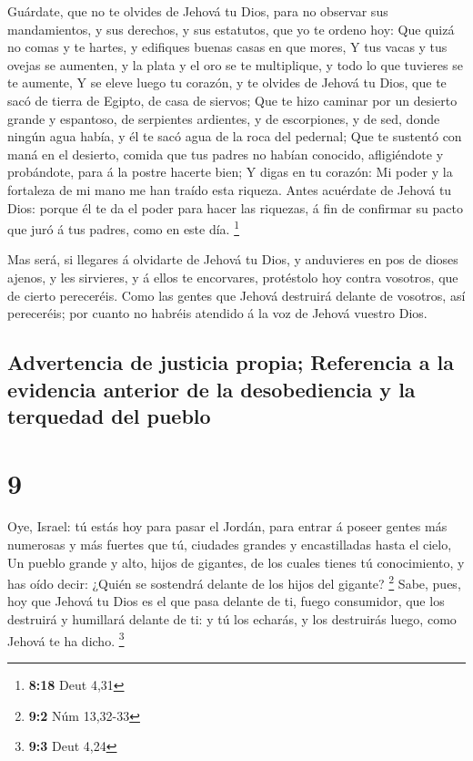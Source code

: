  Guárdate, que no te olvides de Jehová tu Dios, para no
observar sus mandamientos, y sus derechos, y sus estatutos, que yo te
ordeno hoy:  Que quizá no comas y te hartes, y edifiques
buenas casas en que mores,  Y tus vacas y tus ovejas se
aumenten, y la plata y el oro se te multiplique, y todo lo que tuvieres
se te aumente,  Y se eleve luego tu corazón, y te olvides
de Jehová tu Dios, que te sacó de tierra de Egipto, de casa de siervos;
 Que te hizo caminar por un desierto grande y espantoso, de
serpientes ardientes, y de escorpiones, y de sed, donde ningún agua
había, y él te sacó agua de la roca del pedernal;  Que te
sustentó con maná en el desierto, comida que tus padres no habían
conocido, afligiéndote y probándote, para á la postre hacerte bien;
 Y digas en tu corazón: Mi poder y la fortaleza de mi mano
me han traído esta riqueza.  Antes acuérdate de Jehová tu
Dios: porque él te da el poder para hacer las riquezas, á fin de
confirmar su pacto que juró á tus padres, como en este día. \footnote{\textbf{8:18}
  Deut 4,31}

 Mas será, si llegares á olvidarte de Jehová tu Dios, y
anduvieres en pos de dioses ajenos, y les sirvieres, y á ellos te
encorvares, protéstolo hoy contra vosotros, que de cierto pereceréis.
 Como las gentes que Jehová destruirá delante de vosotros,
así pereceréis; por cuanto no habréis atendido á la voz de Jehová
vuestro Dios.

\hypertarget{advertencia-de-justicia-propia-referencia-a-la-evidencia-anterior-de-la-desobediencia-y-la-terquedad-del-pueblo}{%
\subsection{Advertencia de justicia propia; Referencia a la evidencia
anterior de la desobediencia y la terquedad del
pueblo}\label{advertencia-de-justicia-propia-referencia-a-la-evidencia-anterior-de-la-desobediencia-y-la-terquedad-del-pueblo}}

\hypertarget{section-8}{%
\section{9}\label{section-8}}

 Oye, Israel: tú estás hoy para pasar el Jordán, para entrar
á poseer gentes más numerosas y más fuertes que tú, ciudades grandes y
encastilladas hasta el cielo,  Un pueblo grande y alto,
hijos de gigantes, de los cuales tienes tú conocimiento, y has oído
decir: ¿Quién se sostendrá delante de los hijos del gigante? \footnote{\textbf{9:2}
  Núm 13,32-33}  Sabe, pues, hoy que Jehová tu Dios es el
que pasa delante de ti, fuego consumidor, que los destruirá y humillará
delante de ti: y tú los echarás, y los destruirás luego, como Jehová te
ha dicho. \footnote{\textbf{9:3} Deut 4,24}

